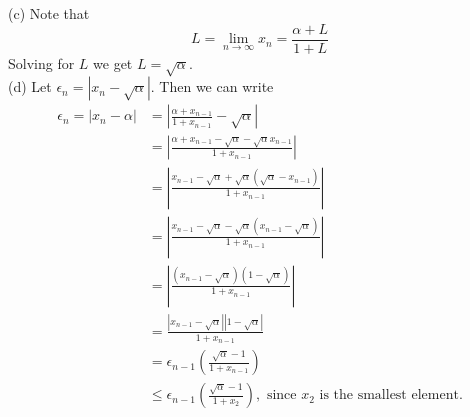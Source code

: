 \documentclass[11pt]{amsart}
\begin{document}
(c) Note that 
\[ L = \lim_{n\rightarrow \infty} x_{n} = \frac{\alpha + L}{1 + L} \]
Solving for $L$ we get $L = \sqrt{\alpha}$. \\

(d) Let $\epsilon_{n} = |x_{n} - \sqrt{\alpha}|$. Then we can write 
\begin{align*}
  \epsilon_{n} = |x_{n} - \alpha| & = \left| \frac{\alpha + x_{n-1}}{1 + x_{n-1}} - \sqrt{\alpha}\right| \\
  & = \left| \frac{\alpha + x_{n-1} - \sqrt{\alpha} - \sqrt{\alpha}x_{n-1}}{1 + x_{n-1}}\right| \\
  & = \left| \frac{x_{n-1} - \sqrt{\alpha} + \sqrt{\alpha}(\sqrt{\alpha} - x_{n-1})}{1 + x_{n-1}}\right| \\
  & = \left| \frac{x_{n-1} - \sqrt{\alpha} - \sqrt{\alpha}(x_{n-1} - \sqrt{\alpha})}{1 + x_{n-1}}\right| \\
  & = \left| \frac{(x_{n-1} - \sqrt{\alpha})(1 - \sqrt{\alpha})}{1 + x_{n-1}}\right| \\
  & = \frac{ |x_{n-1} - \sqrt{\alpha}||1 - \sqrt{\alpha}|}{1 + x_{n-1}} \\
  & = \epsilon_{n-1}\left(\frac{\sqrt{\alpha} - 1}{1 + x_{n-1}}\right) \\
  & \leq \epsilon_{n-1}\left(\frac{\sqrt{\alpha} - 1}{1 + x_{2}}\right), \text{ since }x_{2}\text{ is the smallest element.}
\end{align*}
\end{document}
